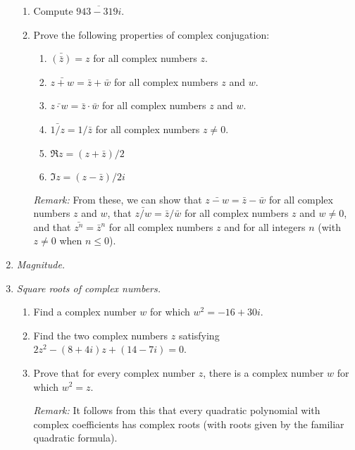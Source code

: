 \begin{enumerate}
\begin{enumerate}
\item Compute $\overline{943 - 319i}$.
\item Prove the following properties of complex conjugation:
\begin{enumerate}
\item $\bar{(\bar{z})} = z$ for all complex numbers $z$.
\item $\bar{z + w} = \bar{z} + \bar{w}$ for all complex numbers $z$ and $w$.
\item $\bar{z\cdot w} = \bar{z}\cdot\bar{w}$ for all complex numbers $z$ and $w$.
\item $\bar{1/z} = 1/\bar{z}$ for all complex numbers $z\neq 0$.
\item $\Re z = (z + \bar{z})/2$
\item $\Im z = (z - \bar{z})/2i$
\end{enumerate}
\emph{Remark:} From these, we can show that $\bar{z - w} = \bar{z} - \bar{w}$ for all complex numbers $z$ and $w$, that $\bar{z/w} = \bar{z}/\bar{w}$ for all complex numbers $z$ and $w\neq 0$, and that $\bar{z^n} = \bar{z}^n$ for all complex numbers $z$ and for all integers $n$ (with $z\neq 0$ when $n\leq 0$).
\end{enumerate}
\item \emph{Magnitude.}
\item \emph{Square roots of complex numbers.}
\begin{enumerate}
\item Find a complex number $w$ for which $w^2 = -16 + 30i$.
\item Find the two complex numbers $z$ satisfying $2z^2 - (8 + 4i)z + (14 - 7i) = 0$.
\item Prove that for every complex number $z$, there is a complex number $w$ for which $w^2 = z$.\par
\emph{Remark:} It follows from this that every quadratic polynomial with complex coefficients has complex roots (with roots given by the familiar quadratic formula).
\end{enumerate}
\end{enumerate}




